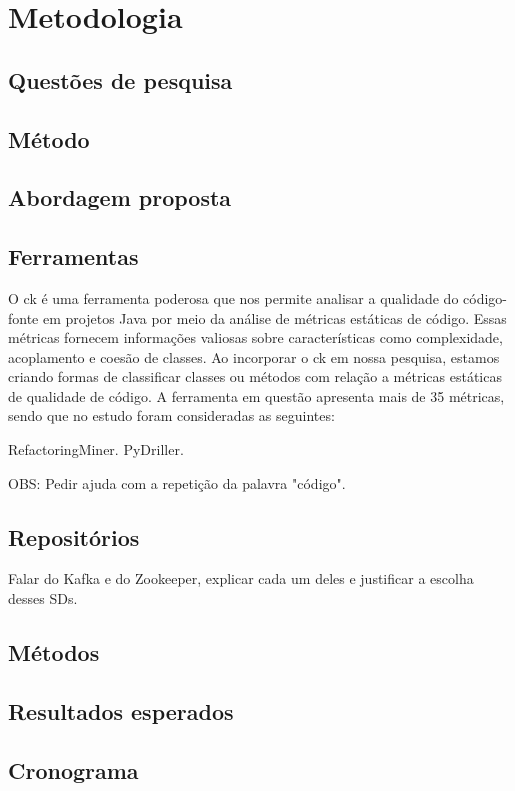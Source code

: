 
\chapter{Metodologia}\label{cap:Metodologia}

\section{Questões de pesquisa}

\section{Método}

\section{Abordagem proposta}

\section{Ferramentas}\label{sec:ferramentas}
O \gls{ck} é uma ferramenta poderosa que nos permite analisar a qualidade do código-fonte em projetos Java por meio da análise de métricas estáticas de código. Essas métricas fornecem informações valiosas sobre características como complexidade, acoplamento e coesão de classes. Ao incorporar o \gls{ck} em nossa pesquisa, estamos criando formas de classificar classes ou métodos com relação a métricas estáticas de qualidade de código. A ferramenta em questão apresenta mais de 35 métricas, sendo que no estudo foram consideradas as seguintes:


RefactoringMiner.
PyDriller.

OBS: Pedir ajuda com a repetição da palavra "código".

\section{Repositórios}\label{sec:repositorios}
Falar do Kafka e do Zookeeper, explicar cada um deles e justificar a escolha desses SDs.

\section{Métodos}\label{sec:metodo}

\section{Resultados esperados}


\section{Cronograma}